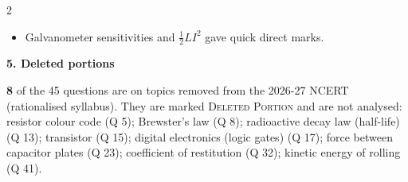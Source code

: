 \begin{multicols}{2}
{\begin{itemize}[leftmargin=1em,nosep]
\item Galvanometer sensitivities and $\tfrac12LI^2$ gave quick direct marks.
\end{itemize}}\par\medskip
\textbf{\color{crimson}5. Deleted portions}\par\smallskip
\textbf{8} of the 45 questions are on topics removed from the 2026-27 NCERT (rationalised syllabus). They are marked \textsc{Deleted Portion} and are not analysed: resistor colour code (Q 5); Brewster's law (Q 8); radioactive decay law (half-life) (Q 13); transistor (Q 15); digital electronics (logic gates) (Q 17); force between capacitor plates (Q 23); coefficient of restitution (Q 32); kinetic energy of rolling (Q 41).\par
\end{multicols}


